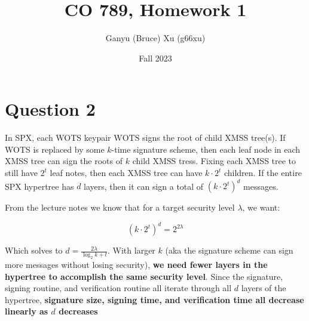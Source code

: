 \documentclass{article}
\title{CO 789, Homework 1}
\author{Ganyu (Bruce) Xu (g66xu)}
\date{Fall 2023}
\begin{document}

\section*{Question 2}
In SPX, each WOTS keypair $\text{WOTS}$ signs the root of child XMSS tree(s). If WOTS is replaced by some $k$-time signature scheme, then each leaf node in each XMSS tree can sign the roots of $k$ child XMSS tress. Fixing each XMSS tree to still have $2^t$ leaf notes, then each XMSS tree can have $k \cdot 2^t$ children. If the entire SPX hypertree has $d$ layers, then it can sign a total of $(k \cdot 2^t)^d$ messages.

From the lecture notes we know that for a target security level $\lambda$, we want:

$$
(k \cdot 2^t)^d = 2^{2\lambda}
$$

Which solves to $d = \frac{2\lambda}{\log_2{k} + t}$. With larger $k$ (aka the signature scheme can sign more messages without losing security), \textbf{we need fewer layers in the hypertree to accomplish the same security level}. Since the signature, signing routine, and verification routine all iterate through all $d$ layers of the hypertree, \textbf{signature size, signing time, and verification time all decrease linearly as $d$ decreases}
\end{document}
